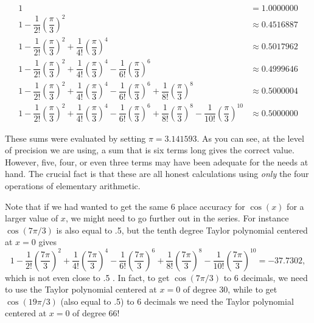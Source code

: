 \mbox{}
\small
\begin{align*}
1 \quad &= 1.0000000 \\[3pt]
1 - \dfrac{1}{2!} \left( \dfrac{\pi}{3} \right)^2 
        &\approx 0.4516887 \\
1 - \dfrac{1}{2!} \left( \dfrac{\pi}{3} \right)^2 
                + \dfrac{1}{4!} \left( \dfrac{\pi}{3} \right)^4
        &\approx  0.5017962 \\
1 - \dfrac{1}{2!} \left( \dfrac{\pi}{3} \right)^2 
                + \dfrac{1}{4!} \left( \dfrac{\pi}{3} \right)^4
                - \dfrac{1}{6!} \left( \dfrac{\pi}{3} \right)^6
        &\approx  0.4999646 \\
1 - \dfrac{1}{2!} \left( \dfrac{\pi}{3} \right)^2 
                + \dfrac{1}{4!} \left( \dfrac{\pi}{3} \right)^4
                - \dfrac{1}{6!} \left( \dfrac{\pi}{3} \right)^6
                + \dfrac{1}{8!} \left( \dfrac{\pi}{3} \right)^8
        &\approx  0.5000004 \\
1 - \dfrac{1}{2!} \left( \dfrac{\pi}{3} \right)^2 
                + \dfrac{1}{4!} \left( \dfrac{\pi}{3} \right)^4
                - \dfrac{1}{6!} \left( \dfrac{\pi}{3} \right)^6
                + \dfrac{1}{8!} \left( \dfrac{\pi}{3} \right)^8
                - \dfrac{1}{10!} \left( \dfrac{\pi}{3} \right)^{10}
        &\approx  0.5000000 
\end{align*}
\normalsize

These sums were evaluated by setting $\pi = 3.141593$.  As you can
see, at the level of precision we are using, a sum that is six terms
long gives the correct value.  However, five, four, or even three
terms may have been adequate for the needs at hand.  The crucial fact
is that these are all honest calculations using {\em only\/} the four
operations of elementary arithmetic.

Note that if we had wanted to get the same 6 place accuracy for
$\cos(x)$ for a larger value of $x$, we might need to go further out
in the series.  For instance $\cos(7\pi/3)$ is also equal to .5, but
the tenth degree Taylor polynomial centered at $x=0$ gives \small
\[
1 - \dfrac{1}{2!} \left( \dfrac{7\pi}{3} \right)^2 
                + \dfrac{1}{4!} \left( \dfrac{7\pi}{3} \right)^4
                - \dfrac{1}{6!} \left( \dfrac{7\pi}{3} \right)^6
                + \dfrac{1}{8!} \left( \dfrac{7\pi}{3} \right)^8
                - \dfrac{1}{10!} \left( \dfrac{7\pi}{3} \right)^{10}
                = -37.7302,
\]
\normalsize%
which is not even close to .5 .  In fact, to get $\cos(7\pi/3)$ to 6
decimals, we need to use the Taylor polynomial centered at $x=0$ of
degree 30, while to get $\cos(19\pi/3)$ (also equal to .5) to 6
decimals we need the Taylor polynomial centered at $x=0$ of degree 66!


